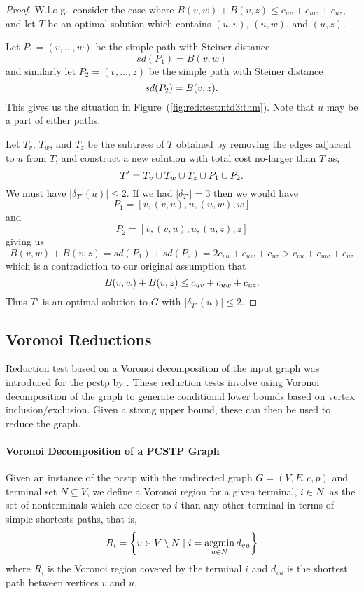 \begin{proof}   
  W.l.o.g.\ consider the case where $B(v,w) + B(v,z) \leq c_{uv} + c_{uw} + c_{uz}$,
  and let $T$ be an optimal solution which contains $(u,v)$, $(u,w)$, and $(u,z)$.

  Let $P_1 = (v, ..., w)$ be the simple path with Steiner distance
  \[sd(P_1) = B(v,w)\]
  and similarly let $P_2 = (v, ..., z)$ be the simple path with Steiner distance
  \[sd(P_2) = B(v,z)\mathnormal{.}\]
  This gives us the situation in Figure~(\ref{fig:red:test:ntd3:thm}). Note that $u$ may be a part of either paths.

  Let $T_v$, $T_w$, and $T_z$ be the subtrees of $T$ obtained by
  removing the edges adjacent to $u$ from $T$, and construct a new solution with
   total cost no-larger than $T$ as,
   \[T' = T_v \cup T_w \cup T_z \cup P_1 \cup P_2\mathnormal{.}\]
   We must have $|\delta_{T'}(u)| \leq 2$. If we had $|\delta_{T'}| = 3$ then
   we would have
   \[P_1 = \left[v, (v,u), u, (u,w), w \right]\]
   and
   \[P_2 = \left[v, (v,u), u, (u,z), z \right]\]
   giving us
   \[B(v,w) + B(v, z) = sd(P_1) + sd(P_2) = 2 c_{vu} + c_{uw} + c_{uz} > c_{vu} + c_{uw} + c_{uz}\]
   which is a contradiction to our original assumption that
   \[B(v,w) + B(v,z) \leq c_{uv} + c_{uw} + c_{uz}\mathnormal{.}\]
   Thus $T'$ is an optimal solution to $G$ with $|\delta_{T'}(u)| \leq 2$.
\end{proof}

\subsection{Voronoi Reductions}

Reduction test based on a Voronoi decomposition of the input graph was introduced for the
\gls{pcstp} by \citet{gamrath2017scip}. These reduction tests
involve using Voronoi decomposition of the graph to generate conditional lower bounds based on
vertex inclusion/exclusion. Given a strong upper bound, these can then be used
to reduce the graph.

\paragraph{Voronoi Decomposition of a PCSTP Graph}

Given an instance of the \gls{pcstp} with the undirected graph $G = (V, E, c, p)$ and terminal set
$N \subseteq V$, we define a Voronoi region for a given terminal, $i \in N$, as the set of nonterminals
which are closer to $i$ than any other terminal in terms of simple shortests paths, that is,
\[R_i = \left\{v \in V \setminus N \mid i = \operatorname*{argmin}_{u \in N} d_{vu}\right\}\]
where $R_i$ is the Voronoi region covered by the terminal $i$ and $d_{vu}$ is the shortest path between vertices
$v$ and $u$.

